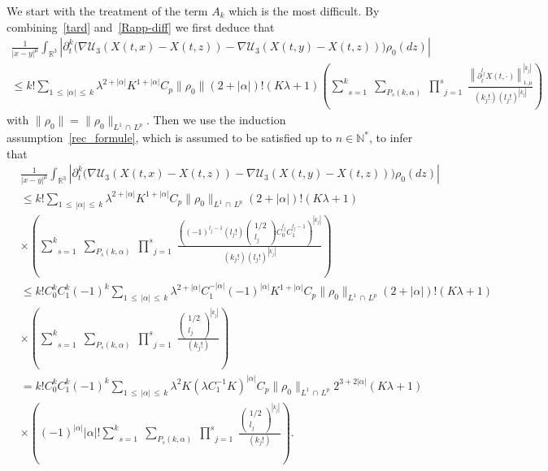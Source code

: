 \documentclass[AHL,Unicode,longabstracts,published]{cedram}
\newcommand{\R}{\mathbb{R}}
\newcommand{\N}{\mathbb{N}}
\newcommand{\clU}{\mathcal{U}}
\renewcommand{\leq}{\leqslant}
\begin{document}
We start with the treatment of the term $A_k$ which is the most difficult. By combining~\eqref{tard} and~\eqref{Rapp-diff} we first deduce that
\begin{multline*}
\frac{1}{|x-y|^\mu}\int_{\R^3}
\left| \partial_t^k \big(\nabla \clU_3(X(t,x)-X(t,z))-\nabla \clU_3(X(t,y)-X(t,z)) \big)\rho_0(dz) \right| \\
 \leq k! \underset{1\,\leq\,|\alpha|\,\leq\,k}{\sum} \lambda^{2+|\alpha|} K^{1+|\alpha|}C_p \|\rho_0\|(2+|\alpha|)! \left(K\lambda+1 \right)\left(\underset{s=1}{\overset{k}{\sum}}\;\underset{P_s(k,\alpha)}{\sum}\;\underset{j=1}{\overset{s}{\prod}}\;\frac{\left\|\partial_t^{l_j}X(t,\cdot)\right\|_{1,\mu}^{\left|k_j\right|}}{(k_j!) (l_j!)^{|k_j|}}\right)
\end{multline*}
with $\|\rho_0\|=\|\rho_0\|_{L^1\,\cap\,L^p}$. Then we use the induction assumption~\eqref{rec_formule}, which is assumed to be satisfied up to $n \in \N^*$, to infer that
\begin{align*}
&\frac{1}{|x-y|^\mu}\int_{\R^3} \left| \partial_t^k \big(\nabla \clU_3(X(t,x)-X(t,z))-\nabla \clU_3(X(t,y)-X(t,z)) \big)\rho_0(dz) \right| \\
& \leq k! \underset{1\, \leq\,|\alpha|\,\leq\,k}{\sum} \lambda^{2+|\alpha|} K^{1+|\alpha|}C_p \|\rho_0\|_{L^1\,\cap\,L^p}(2+|\alpha|)! \left(K\lambda+1 \right)\\
&\times \left(\underset{s=1}{\overset{k}{\sum}}\;\underset{P_s(k,\alpha)}{\sum}\;\underset{j=1}{\overset{s}{\prod}}\;\frac{\left((-1)^{l_j-1} \left(l_j!\right)
\begin{pmatrix}
1/2\\ l_j
\end{pmatrix}C_0^{l_j}C_1^{l_j-1}\right)^{\left|k_j\right|}}{\left(k_j!\right) \left(l_j!\right)^{\left|k_j\right|}}\right)\\
& \leq k!C_0^k C_1^k (-1)^k \underset{1\,\leq\,|\alpha|\,\leq\,k}{\sum} \lambda^{2+|\alpha|} C_1^{-|\alpha|}(-1)^{|\alpha|}K^{1+|\alpha|}C_p \|\rho_0\|_{L^1\,\cap\,L^p}(2+|\alpha|)! \left(K\lambda+1 \right)\\
&\times \left(\underset{s=1}{\overset{k}{\sum}}\;\underset{P_s(k,\alpha)}{\sum}\;\underset{j=1}{\overset{s}{\prod}}\;\frac{
\begin{pmatrix}
1/2\\ l_j
\end{pmatrix}^{|k_j|}}{(k_j!)}\right)\\
&= k!C_0^k C_1^k (-1)^k \underset{1\,\leq\,|\alpha|\,\leq\,k}{\sum} \lambda^{2} K\left(\lambda C_1^{-1}K\right)^{|\alpha|}C_p \|\rho_0\|_{L^1\,\cap\,L^p}2^{3+2|\alpha|}\left(K\lambda+1\right)\\
&\times \left((-1)^{|\alpha|} |\alpha|! \underset{s=1}{\overset{k}{\sum}}\;\underset{P_s(k,\alpha)}{\sum}\;\underset{j=1}{\overset{s}{\prod}}\;\frac{
\begin{pmatrix}
1/2\\ l_j
\end{pmatrix}^{|k_j|}}{(k_j!)}\right).
\end{align*}
\end{document}
